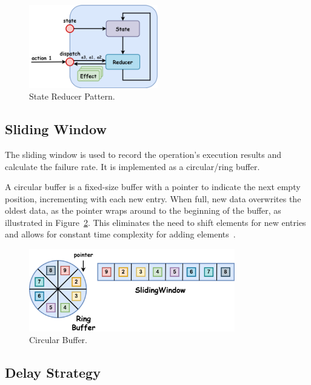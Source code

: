 \begin{figure}[!htb]
    \centering
    \includegraphics[width=0.5\textwidth]{../figures/05_reducer-pattern}
    \caption{State Reducer Pattern.}
    \label{fig:reducer-pattern}
\end{figure}

\subsection{Sliding Window}\label{subsec:cbreaker-sliding-window}

The sliding window is used to record the operation's execution results and calculate the failure rate.
It is implemented as a circular/ring buffer.

A circular buffer is a fixed-size buffer with a pointer to indicate the next empty position, incrementing with each new entry.
When full, new data overwrites the oldest data, as the pointer wraps around to the beginning of the buffer, as illustrated in Figure~\ref{fig:05_circular-buffer}.
This eliminates the need to shift elements for new entries and allows for constant time complexity for adding elements~\cite{circular-buffer}.

\begin{figure}[!htb]
    \centering
    \includegraphics[width=0.8\textwidth]{../figures/05_circular-buffer}
    \caption{Circular Buffer.}
    \label{fig:05_circular-buffer}
\end{figure}

\subsection{Delay Strategy}\label{subsec:cbreaker-delay-strategy}

